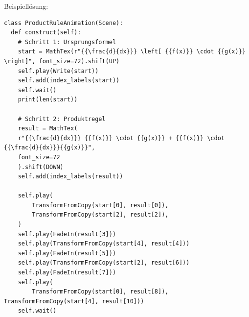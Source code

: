 \documentclass[a4paper, 12pt]{mksheetphhd}
\begin{document}
	\newpage
	
	Beispiellösung:
	\begin{verbatim}
class ProductRuleAnimation(Scene):
  def construct(self):
    # Schritt 1: Ursprungsformel
    start = MathTex(r"{{\frac{d}{dx}}} \left[ {{f(x)}} \cdot {{g(x)}} \right]", font_size=72).shift(UP)
    self.play(Write(start))
    self.add(index_labels(start))
    self.wait()
    print(len(start))
    
    # Schritt 2: Produktregel
    result = MathTex(
    r"{{\frac{d}{dx}}} {{f(x)}} \cdot {{g(x)}} + {{f(x)}} \cdot {{\frac{d}{dx}}}{{g(x)}}",
    font_size=72
    ).shift(DOWN)
    self.add(index_labels(result))
    
    self.play(
    	TransformFromCopy(start[0], result[0]),
    	TransformFromCopy(start[2], result[2]),
    )
    self.play(FadeIn(result[3]))
    self.play(TransformFromCopy(start[4], result[4]))
    self.play(FadeIn(result[5]))
    self.play(TransformFromCopy(start[2], result[6]))
    self.play(FadeIn(result[7]))
    self.play(
    	TransformFromCopy(start[0], result[8]), TransformFromCopy(start[4], result[10]))
    self.wait()
	\end{verbatim}
	
	\printlicense
	
	\printsocials
	
\end{document}
